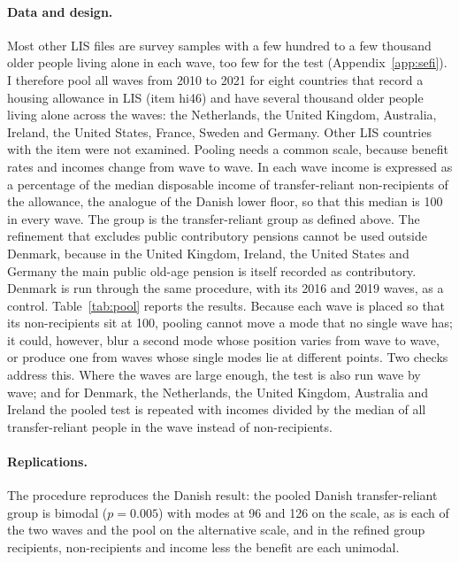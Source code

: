 \paragraph{Data and design.} Most other LIS files are survey samples with a few hundred to a few thousand older people living alone in each wave, too few for the test (Appendix~\ref{app:sefi}). I therefore pool all waves from 2010 to 2021 for eight countries that record a housing allowance in LIS (item hi46) and have several thousand older people living alone across the waves: the Netherlands, the United Kingdom, Australia, Ireland, the United States, France, Sweden and Germany. Other LIS countries with the item were not examined. Pooling needs a common scale, because benefit rates and incomes change from wave to wave. In each wave income is expressed as a percentage of the median disposable income of transfer-reliant non-recipients of the allowance, the analogue of the Danish lower floor, so that this median is 100 in every wave. The group is the transfer-reliant group as defined above. The refinement that excludes public contributory pensions cannot be used outside Denmark, because in the United Kingdom, Ireland, the United States and Germany the main public old-age pension is itself recorded as contributory. Denmark is run through the same procedure, with its 2016 and 2019 waves, as a control. Table~\ref{tab:pool} reports the results. Because each wave is placed so that its non-recipients sit at 100, pooling cannot move a mode that no single wave has; it could, however, blur a second mode whose position varies from wave to wave, or produce one from waves whose single modes lie at different points. Two checks address this. Where the waves are large enough, the test is also run wave by wave; and for Denmark, the Netherlands, the United Kingdom, Australia and Ireland the pooled test is repeated with incomes divided by the median of all transfer-reliant people in the wave instead of non-recipients.



\paragraph{Replications.} The procedure reproduces the Danish result: the pooled Danish transfer-reliant group is bimodal ($p=0.005$) with modes at 96 and 126 on the scale, as is each of the two waves and the pool on the alternative scale, and in the refined group recipients, non-recipients and income less the benefit are each unimodal.

